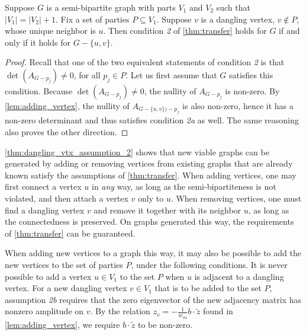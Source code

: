 %
%
%
\begin{corollary}
Suppose $G$ is a semi-bipartite graph with parts $V_1$ and $V_2$ such that $|V_1| = |V_2|+1$. Fix a set of parties $P\subseteq V_1$. Suppose $v$ is a dangling vertex, $v \not\in P$, whose unique neighbor is $u$. Then condition \emph{2} of 
\cref{thm:transfer} holds for $G$ if and only if it holds for $G-\{u,v\}$.
\label{thm:dangling_vtx_assumption_2}
\end{corollary}
\begin{proof}
Recall that one of the two equivalent statements of condition \emph{2} is that $\det(A_{G-p_j}) \neq 0$, for all $p_j \in P$. Let us first assume that $G$ satisfies this condition. Because $\det(A_{G-p_j}) \neq 0$, the nullity of $A_{G-p_j}$ is non-zero. By \cref{lem:adding_vertex}, the nullity of $A_{G-\{u,v\})-p_j}$ is also non-zero, hence it has a non-zero determinant and thus satisfies condition \emph{2a} as well. 
%
The same reasoning also proves the other direction.
\end{proof}

\cref{thm:dangling_vtx_assumption_2} shows that new viable graphs can be generated by adding or removing vertices from existing graphs that are already known satisfy the assumptions of \cref{thm:transfer}. When adding vertices, one may first connect a vertex $u$ in \emph{any} way, as long as the semi-bipartiteness is not violated, and then attach a vertex $v$ only to $u$. When removing vertices, one must find a dangling vertex $v$ and remove it together with its neighbor $u$, as long as the connectedness is preserved. On graphs generated this way, the requirements of \cref{thm:transfer} can be guaranteed.

When adding new vertices to a graph this way, it may also be possible to add the new vertices to the set of parties $P$, under the following conditions. It is never possible to add a vertex $u\in V_1$ to the set $P$ when $u$ is adjacent to a dangling vertex. For a new dangling vertex $v \in V_1$ that is to be added to the set $P$, assumption \emph{2b} requires that the zero eigenvector of the new adjacency matrix has nonzero amplitude on $v$. By the relation $z_v=-\frac1{w_{vu}} b \cdot \tilde{z}$ found in \cref{lem:adding_vertex}, we require $b \cdot \tilde{z}$ to be non-zero. 



